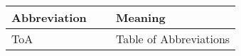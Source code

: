 \begin{center}
	\begin{table}[h]
		\centering
		\label{tab:nomenclature_abbrev}
		\begin{tabular}{m{3.5cm} m{0.2cm} m{8.5cm}}
		\hline		
		\textbf{Abbreviation} & ~ & \textbf{Meaning}\\
		\hline		
		ToA & ~ & Table of Abbreviations\\
		\hline
		\end{tabular}
	\end{table}
\end{center}
\vfill